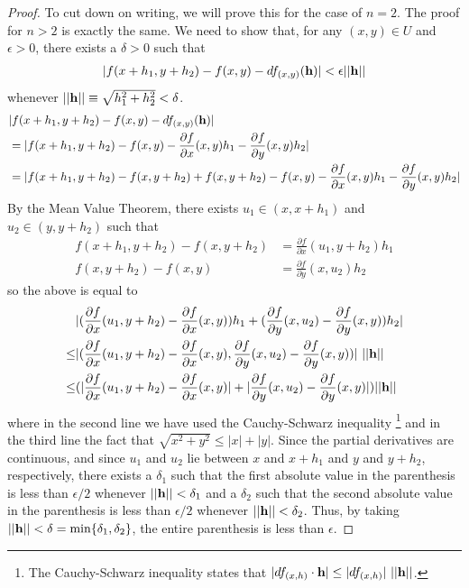 \documentclass[12pt,letterpaper,reqno]{article}
\numberwithin{equation}{section}
\begin{document}
{\begin{proof}
To cut down on writing, we will prove this for the case of $n=2$. The proof for $n>2$ is exactly the same. We need to show that, for any $(x,y) \in U$ and $\epsilon > 0$, there exists a $\delta > 0$ such that
\begin{align*}
	|f(x+h_1,y+h_2)-f(x,y)-df_{(x,y)}({\bf h})|<\epsilon||{\bf h}||
\end{align*}
whenever $||{\bf h}||\equiv \sqrt{h_1^2+h_2^2}< \delta$.  
\begin{align*}
	&|f(x+h_1,y+h_2)-f(x,y)-df_{(x,y)}({\bf h})|\\
	&=|f(x+h_1,y+h_2)-f(x,y)-\frac{\partial f}{\partial x}(x,y)h_1-\frac{\partial f}{\partial y}(x,y)h_2| \\
	&=|f(x+h_1,y+h_2)-f(x,y+h_2)+f(x,y+h_2)-f(x,y)-\frac{\partial f}{\partial x}(x,y)h_1-\frac{\partial f}{\partial y}(x,y)h_2| \\
\end{align*}
By the Mean Value Theorem, there exists $u_1 \in (x,x+h_1)$ and $u_2 \in (y,y+h_2)$ such that
\begin{align*}
	f(x+h_1,y+h_2)-f(x,y+h_2)&=\frac{\partial f}{\partial x}(u_1,y+h_2)h_1 \\
	f(x,y+h_2)-f(x,y)&=\frac{\partial f}{\partial y}(x,u_2)h_2
\end{align*}
so the above is equal to
\begin{align*}
	&|(\frac{\partial f}{\partial x}(u_1,y+h_2)-\frac{\partial f}{\partial x}(x,y))h_1+(\frac{\partial f}{\partial y}(x,u_2)-\frac{\partial f}{\partial y}(x,y))h_2|\\
	 \leq &|(\frac{\partial f}{\partial x}(u_1,y+h_2)-\frac{\partial f}{\partial x}(x,y), \frac{\partial f}{\partial y}(x,u_2)-\frac{\partial f}{\partial y}(x,y))| \ ||{\bf h}|| \\
	 \leq &(|\frac{\partial f}{\partial x}(u_1,y+h_2)-\frac{\partial f}{\partial x}(x,y)|+|\frac{\partial f}{\partial y}(x,u_2)-\frac{\partial f}{\partial y}(x,y)|)||{\bf h}||
\end{align*}
where in the second line we have used the Cauchy-Schwarz inequality \footnote{The Cauchy-Schwarz inequality states that $|df_{(x,h)}\cdot {\bf h}|\leq |df_{(x,h)}| \ ||{\bf h}||$.} and in the third line the fact that $\sqrt{x^2+y^2}\leq |x|+|y|$. Since the partial derivatives are continuous, and since $u_1$ and $u_2$ lie between $x$ and $x+h_1$ and $y$ and $y+h_2$, respectively, there exists a $\delta_1$ such that the first absolute value in the parenthesis is less than $\epsilon/2$ whenever $||{\bf h}||<\delta_1$ and a $\delta_2$ such that the second absolute value in the parenthesis is less than $\epsilon/2$ whenever $||{\bf h}||<\delta_2$. Thus, by taking $||{\bf h}||<\delta=\text{min}\{\delta_1,\delta_2\}$, the entire parenthesis is less than $\epsilon$.
\end{proof}



}
\end{document}
